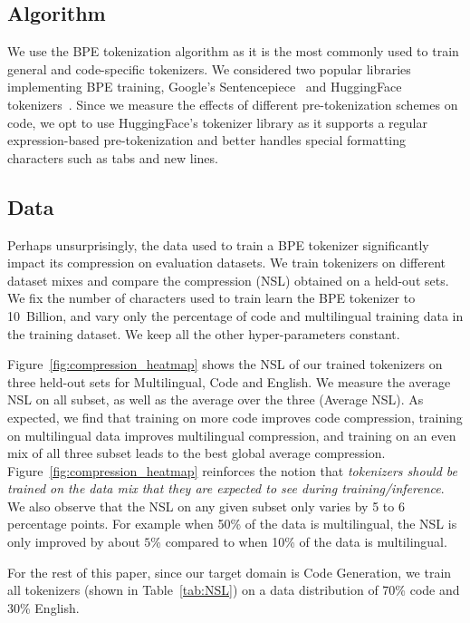 \subsection{Algorithm} 

We use the BPE \cite{sennrich-etal-2016-neural} tokenization algorithm as it is the most commonly used to train general and code-specific tokenizers. We considered two popular libraries implementing BPE training, Google's Sentencepiece~\citep{Kudo2018SentencePieceAS} and HuggingFace tokenizers~\citep{Wolf2019HuggingFacesTS}. Since we measure the effects of different pre-tokenization schemes on code, we opt to use HuggingFace's tokenizer library as it supports a regular expression-based pre-tokenization and better handles special formatting characters such as tabs and new lines. 

\subsection{Data}
Perhaps unsurprisingly, the data used to train a BPE tokenizer significantly impact its compression on evaluation datasets. We train tokenizers on different dataset mixes and compare the compression (NSL) obtained on a held-out sets. We fix the number of characters used to train learn the BPE tokenizer to 10~Billion, and vary only the percentage of code and multilingual training data in the training dataset. We keep all the other hyper-parameters constant. 

Figure~\ref{fig:compression_heatmap} shows the NSL of our trained tokenizers on three held-out sets for Multilingual, Code and English. We measure the average NSL on all subset, as well as the average over the three (Average NSL). As expected, we find that training on more code improves code compression, training on multilingual data improves multilingual compression, and training on an even mix of all three subset leads to the best global average compression.
Figure~\ref{fig:compression_heatmap} reinforces the notion that \textit{tokenizers should be trained on the data mix that they are expected to see during training/inference}. We also observe that the NSL on any given subset only varies by 5 to 6 percentage points. For example when 50\% of the data is multilingual, the NSL is only improved by about $5$\% compared to when 10\% of the data is multilingual.

For the rest of this paper, since our target domain is Code Generation, we train all tokenizers (shown in Table~\ref{tab:NSL}) on a data distribution of 70\% code and 30\% English.

